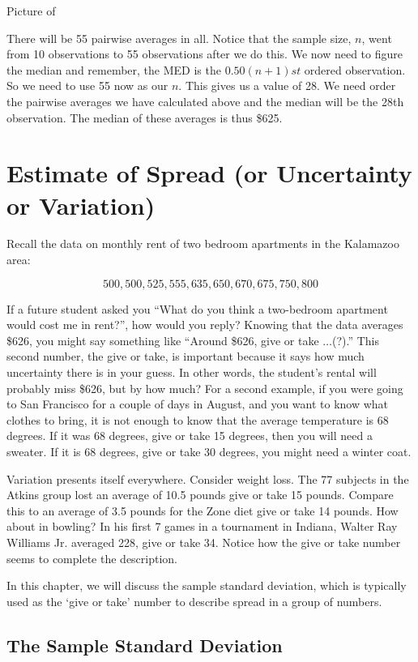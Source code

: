 \documentclass[11pt, chapterprefix=true]{scrbook}\usepackage[]{graphicx}\usepackage[]{color}
\begin{document}
Picture of

There will be 55 pairwise averages in all.  Notice that the sample size, $n$, went from 10 observations to 55 observations after we do this.  We now need to figure the median and remember, the MED is the $0.50(n + 1)st$ ordered observation.  So we need to use 55 now as our $n$.  This gives us a value of 28.  We need order the pairwise averages we have calculated above and the median will be the 28th observation.  The median of these averages is thus \$625.

\section{Estimate of Spread (or Uncertainty or Variation)}

Recall the data on monthly rent of two bedroom apartments in the Kalamazoo area:

$$ 500, 500, 525, 555, 635, 650, 670, 675, 750, 800 $$

If a future student asked you ``What do you think a two-bedroom apartment would cost me in rent?'', how would you reply? Knowing that the data averages \$626, you might say something like ``Around \$626, give or take $\dots$(?).''   This second number, the give or take, is important because it says how much uncertainty there is in your guess.  In other words, the student's rental will probably miss \$626, but by how much?  For a second example, if you were going to San Francisco for a couple of days in August, and you want to know what clothes to bring, it is not enough to know that the average temperature is 68 degrees.  If it was 68 degrees, give or take 15 degrees, then you will need a sweater.  If it is 68 degrees, give or take 30 degrees, you might need a winter coat.

Variation presents itself everywhere.  Consider weight loss.  The 77 subjects in the Atkins group lost an average of 10.5 pounds give or take 15 pounds.  Compare this to an average of 3.5 pounds for the Zone diet give or take 14 pounds. How about in bowling?  In his first 7 games in a tournament in Indiana, Walter Ray Williams Jr. averaged 228, give or take 34.   Notice how the give or take number seems to complete the description.

In this chapter, we will discuss the sample standard deviation, which is typically used as the ‘give or take’ number to describe spread in a group of numbers.

\subsection{The Sample Standard Deviation}
\end{document}
